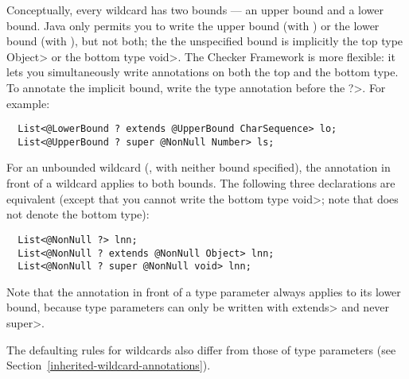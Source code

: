 Conceptually, every wildcard has two bounds --- an upper bound and a lower
bound.  Java only permits you to write the upper bound (with
) or the lower bound (with ), but not both; the the unspecified bound is implicitly the
top type
\<Object> or the bottom type \<void>.  The Checker Framework is more
flexible:  it lets you simultaneously write annotations on both the top and
the bottom type.  To annotate the implicit bound, write the type annotation
before the \<?>.  For example:

\begin{Verbatim}
  List<@LowerBound ? extends @UpperBound CharSequence> lo;
  List<@UpperBound ? super @NonNull Number> ls;
\end{Verbatim}

For an unbounded wildcard (, with neither
bound specified), the annotation in front of a wildcard applies
to both bounds.  The following three declarations are equivalent (except
that you cannot write the bottom type \<void>; note that
 does not denote the bottom type):

\begin{Verbatim}
  List<@NonNull ?> lnn;
  List<@NonNull ? extends @NonNull Object> lnn;
  List<@NonNull ? super @NonNull void> lnn;
\end{Verbatim}

\noindent
Note that the annotation in front of a type parameter always applies to its
lower bound, because type parameters can only be written with \<extends>
and never \<super>.



The defaulting rules for
wildcards also differ from those of type parameters (see
Section~\ref{inherited-wildcard-annotations}).


